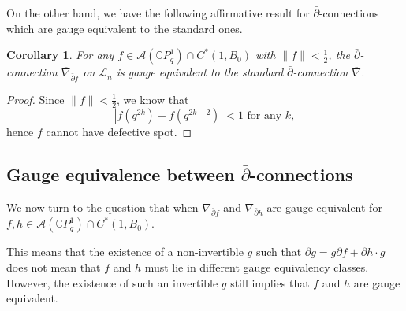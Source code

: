 \documentclass[12pt]{article}
\newtheorem{corollary}[definition]{Corollary}
\numberwithin{equation}{section}
\def\pb{\bar{\partial}}
\def\C{{\mathbb C}}
\def\A{\mathcal{A}}
\def\L{\mathcal{L}}
\begin{document}
On the other hand, we have the following affirmative result for $\pb$-connections which are gauge equivalent to the standard ones.

\begin{corollary}\label{coro: less than one half gauge equivalent to zero}
    For any $f\in  \A(\C P^1_q)\cap C^*(1, B_0)$ with $\|f\|<\frac{1}{2}$, the $\pb$-connection $\overline{\nabla}_{\pb f}$ on $\L_n$ is gauge equivalent to the standard $\pb$-connection $\overline{\nabla}$.
\end{corollary}
\begin{proof}
    Since $\|f\|<\frac{1}{2}$, we know that 
    $$|f(q^{2k})-f(q^{2k-2})|<1 \text{ for any }k,$$ hence $f$ cannot have defective spot.
\end{proof}

\subsection{Gauge equivalence between $\pb$-connections}\label{subsec: gauge equivalence C(1, B0)}
We now turn to the question that when $\overline{\nabla}_{\pb f}$ and $\overline{\nabla}_{\pb h}$ are gauge equivalent for $f, h \in \A(\C P^1_q)\cap C^*(1, B_0)$.



This means that the existence of a non-invertible $g$ such that $\pb g = g \pb f + \pb h \cdot g$ does not mean that $f$ and $h$ must lie in different gauge equivalency classes. However, the existence of such an invertible $g$ still implies that $f$ and $h$ are gauge equivalent.
\end{document}
